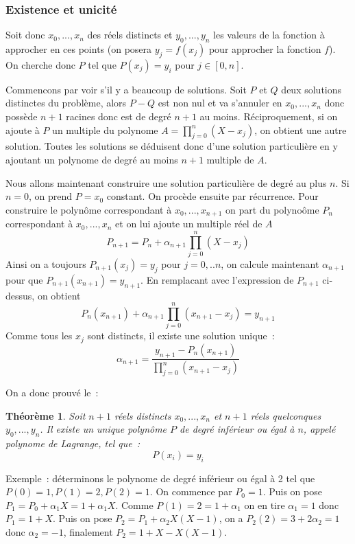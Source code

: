 \documentclass[a4paper,11pt]{article}
\newtheorem{thm}{Théorème}
\begin{document}
\subsubsection{Existence et unicit\'e}
Soit donc $x_0,...,x_n$ des r\'eels distincts et $y_0,...,y_n$
les valeurs de la fonction \`a approcher en ces points (on posera
$y_j=f(x_j)$ pour approcher la fonction $f$). On cherche
donc $P$ tel que $P(x_j)=y_i$ pour $j \in [0,n]$.

Commencons par voir s'il y a beaucoup de solutions. Soit $P$ et $Q$
deux solutions distinctes du probl\`eme, alors $P-Q$ est non nul
et va s'annuler en $x_0, ...,x_n$ donc poss\`ede $n+1$ racines donc
est de degr\'e $n+1$ au moins. R\'eciproquement, si on ajoute
\`a $P$ un multiple du polynome $A=\prod_{j=0}^n (X-x_j)$, on obtient
une autre solution. Toutes les solutions se d\'eduisent donc
d'une solution particuli\`ere en y ajoutant un polynome de degr\'e
au moins $n+1$ multiple de $A$. 

Nous allons maintenant construire
une solution particuli\`ere de degr\'e au plus $n$.
Si $n=0$, on prend $P=x_0$ constant. On proc\`ede ensuite par
r\'ecurrence. Pour construire le polyn\^ome correspondant
\`a $x_0,...,x_{n+1}$ on part du polyno\^ome $P_n$ correspondant \`a
$x_0,...,x_{n}$ et on lui ajoute un multiple r\'eel de $A$
\[ P_{n+1}=P_n+ \alpha_{n+1} \prod_{j=0}^n (X-x_j) \]
Ainsi on a toujours $P_{n+1}(x_j)=y_j$ pour $j=0,..n$, on calcule
maintenant $ \alpha_{n+1}$ pour que $P_{n+1}(x_{n+1})=y_{n+1}$.
En remplacant avec l'expression de $P_{n+1}$ ci-dessus, on obtient
\[ P_n(x_{n+1})+  \alpha_{n+1} \prod_{j=0}^n (x_{n+1}-x_j) = y_{n+1} \]
Comme tous les $x_j$ sont distincts, il existe une solution unique~:
\[  \alpha_{n+1}=\frac{y_{n+1}-P_n(x_{n+1})}{\prod_{j=0}^n (x_{n+1}-x_j)}\]

On a donc prouv\'e le~:
\begin{thm}  
Soit $n+1$ r\'eels distincts $x_0,...,x_n$ et $n+1$
r\'eels quelconques $y_0,...,y_n$.
Il existe un unique polyn\^ome $P$ de degr\'e inf\'erieur ou \'egal \`a
$n$, appel\'e polynome de Lagrange, tel que~:
\[ P(x_i)=y_i\]
\end{thm}

Exemple~: d\'eterminons le polynome de degr\'e inf\'erieur ou \'egal
\`a 2 tel que $P(0)=1, P(1)=2, P(2)=1$. On commence par $P_0=1$.
Puis on pose $P_1=P_0+ \alpha_{1}X=1+ \alpha_{1}X$. 
Comme $P(1)=2=1+ \alpha_{1}$ on en tire $ \alpha_{1}=1$
donc $P_1=1+X$. Puis on pose $P_2=P_1+ \alpha_{2}X(X-1)$, on a 
$P_2(2)=3+2 \alpha_{2}=1$
donc $ \alpha_{2}=-1$, finalement $P_2=1+X-X(X-1)$.
\end{document}
